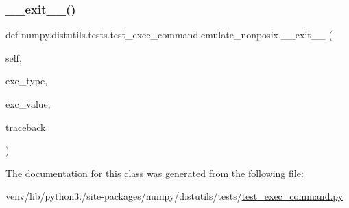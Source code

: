 \subsubsection{\texorpdfstring{\+\_\+\+\_\+exit\+\_\+\+\_\+()}{\_\_exit\_\_()}}
{\footnotesize\ttfamily def numpy.\+distutils.\+tests.\+test\+\_\+exec\+\_\+command.\+emulate\+\_\+nonposix.\+\_\+\+\_\+exit\+\_\+\+\_\+ (\begin{DoxyParamCaption}\item[{}]{self,  }\item[{}]{exc\+\_\+type,  }\item[{}]{exc\+\_\+value,  }\item[{}]{traceback }\end{DoxyParamCaption})}



The documentation for this class was generated from the following file\+:\begin{DoxyCompactItemize}
\item 
venv/lib/python3./site-\/packages/numpy/distutils/tests/\hyperlink{test__exec__command_8py}{test\+\_\+exec\+\_\+command.\+py}\end{DoxyCompactItemize}
